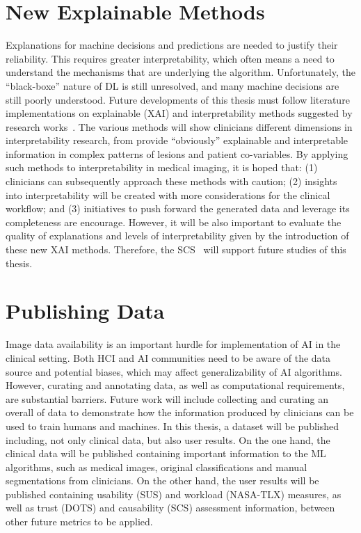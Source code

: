 \section{New Explainable Methods}
\label{sec:chap008003}

Explanations for machine decisions and predictions are needed to justify their reliability.
This requires greater interpretability, which often means a need to understand the mechanisms that are underlying the algorithm.
Unfortunately, the ``black-boxe'' nature of \ac{DL} is still unresolved, and many machine decisions are still poorly understood.
Future developments of this thesis must follow literature implementations on explainable (\ac{XAI}) and interpretability methods suggested by research works~\cite{9233366}.
The various methods will show clinicians different dimensions in interpretability research, from provide ``obviously'' explainable and interpretable information in complex patterns of lesions and patient co-variables.
By applying such methods to interpretability in medical imaging, it is hoped that: (1) clinicians can subsequently approach these methods with caution; (2) insights into interpretability will be created with more considerations for the clinical workflow; and (3) initiatives to push forward the generated data and leverage its completeness are encourage.
However, it will be also important to evaluate the quality of explanations and levels of interpretability given by the introduction of these new \ac{XAI} methods.
Therefore, the \ac{SCS}~\cite{andreas2020measuring} will support future studies of this thesis.

\section{Publishing Data}
\label{sec:chap008004}

Image data availability is an important hurdle for implementation of \ac{AI} in the clinical setting.
Both \ac{HCI} and \ac{AI} communities need to be aware of the data source and potential biases, which may affect generalizability of \ac{AI} algorithms.
However, curating and annotating data, as well as computational requirements, are substantial barriers.
Future work will include collecting and curating an overall of data to demonstrate how the information produced by clinicians can be used to train humans and machines.
In this thesis, a dataset will be published including, not only clinical data, but also user results.
On the one hand, the clinical data will be published containing important information to the \ac{ML} algorithms, such as medical images, original classifications and manual segmentations from clinicians.
On the other hand, the user results will be published containing usability (\ac{SUS}) and workload (\ac{NASA-TLX}) measures, as well as trust (\ac{DOTS}) and causability (\ac{SCS}) assessment information, between other future metrics to be applied.